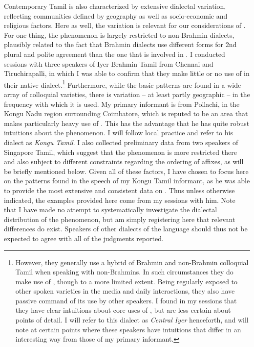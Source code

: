\documentclass[output=paper, modfonts, nonflat]{langsci/langscibook}
\begin{document}
Contemporary Tamil is also characterized by extensive dialectal
variation, reflecting communities defined by geography as well as
socio-economic and religious factors. Here as well, the variation is
relevant for our considerations of \allagr. For one thing, the
phenomenon is largely restricted to non-Brahmin dialects, plausibly
related to the fact that Brahmin dialects use different forms for 2nd
plural and polite agreement than the one that is involved in
\allagr. I conducted sessions with three speakers of Iyer Brahmin
Tamil from Chennai and Tiruchirapalli, in which I was able to confirm
that they make little or no use of \allagr{} in their native
dialect.\footnote{However, they generally use a hybrid of Brahmin and
  non-Brahmin colloquial Tamil when speaking with non-Brahmins. In
  such circumstances they do make use of \allagr, though to a more
  limited extent. Being regularly exposed to other spoken varieties in
  the media and daily interactions, they also have passive command of
  its use by other speakers. I found in my sessions that they have
  clear intuitions about core uses of \allagr, but are less certain
  about points of detail. I will refer to this dialect as \textit{Central
  Iyer} henceforth, and will note at certain points where these
  speakers have intuitions that differ in an interesting way from
  those of my primary informant.}  Furthermore, while the basic
\allagr{} patterns are found in a wide array of colloquial varieties,
there is variation -- at least partly geographic -- in the frequency
with which it is used. My primary informant is from Pollachi, in the
Kongu Nadu region surrounding Coimbatore, which is reputed to be an
area that makes particularly heavy use of \allagr. This has the
advantage that he has quite robust intuitions about the phenomenon. I
will follow local practice and refer to his dialect as \textit{Kongu
Tamil}. I also collected preliminary data from two speakers of
Singapore Tamil, which suggest that the phenomenon is more restricted
there and also subject to different constraints regarding the ordering
of affixes, as will be briefly mentioned below.  Given all of these
factors, I have chosen to focus here on the patterns found in the
speech of my Kongu Tamil informant, as he was able to provide the most
extensive and consistent data on \allagr. Thus unless otherwise
indicated, the examples provided here come from my sessions with
him. Note that I have made no attempt to systematically investigate
the dialectal distribution of the phenomenon, but am simply
registering here that relevant differences do exist.  Speakers of
other dialects of the language should thus not be expected to agree
with all of the judgments reported.
\end{document}
